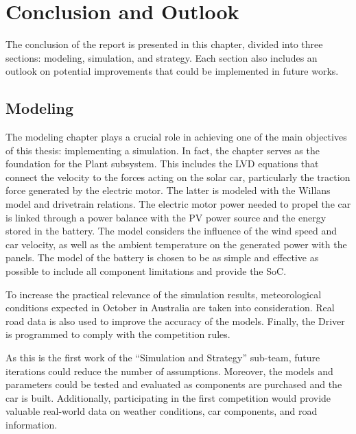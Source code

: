 
\chapter{Conclusion and Outlook}
\label{chp:conclusion}
The conclusion of the report is presented in this chapter, divided into three sections: modeling, simulation, and strategy. Each section also includes an outlook on potential improvements that could be implemented in future works.


\section{Modeling}
The modeling chapter plays a crucial role in achieving one of the main objectives of this thesis: implementing a simulation. In fact, the chapter serves as the foundation for the Plant subsystem. This includes the LVD equations that connect the velocity to the forces acting on the solar car, particularly the traction force generated by the electric motor. The latter is modeled with the Willans model and drivetrain relations. The electric motor power needed to propel the car is linked through a power balance with the PV power source and the energy stored in the battery. The model considers the influence of the wind speed and car velocity, as well as the ambient temperature on the generated power with the panels. The model of the battery is chosen to be as simple and effective as possible to include all component limitations and provide the SoC.

To increase the practical relevance of the simulation results, meteorological conditions expected in October in Australia are taken into consideration. Real road data is also used to improve the accuracy of the models. Finally, the Driver is programmed to comply with the competition rules.

As this is the first work of the \enquote{Simulation and Strategy} sub-team, future iterations could reduce the number of assumptions. Moreover, the models and parameters could be tested and evaluated as components are purchased and the car is built. Additionally, participating in the first competition would provide valuable real-world data on weather conditions, car components, and road information.


